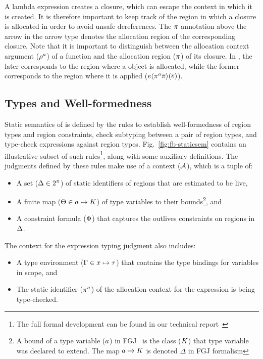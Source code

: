 A lambda expression creates a closure, which can escape the
context in which it is created. It is therefore important to keep track of
the region in which a closure is allocated in order to avoid unsafe
dereferences. The $\pi$ annotation above the arrow in the arrow
type denotes the allocation region of the corresponding closure. Note
that it is important to distinguish between the allocation context
argument ($\rho^a$) of a function and the allocation region
($\pi$) of its closure. In \name, the later corresponds to the region where
a  object is allocated, while the former corresponds to the
region where it is applied ($e\langle \pi^a\overline{\pi} \rangle(\overline{e})$). 


\subsection{Types and Well-formedness}

Static semantics of \fbname is defined by the rules to establish
well-formedness of region types and region constraints, check
subtyping between a pair of region types, and type-check expressions
against region types. Fig.~\ref{fig:fb-staticsem} contains an
illustrative subset of such rules\footnote{The full formal development
can be found in our technical report~\cite{techrep}}, along with some
auxiliary definitions. The judgments defined by these rules make use
of a context (${\mathcal{A}}$), which is a tuple of:
\begin{itemize}
\item A set ($\Delta \in 2^\pi$) of static identifiers of regions
that are estimated to be live,
\item A finite map ($\Theta \in a \mapsto K$) of type
variables to their bounds\footnote{A bound of a type variable
($a$) in FGJ~\cite{fgj} is the class ($K$) that type variable
was declared to extend.  The map $a \mapsto K$ is denoted
$\Delta$ in FGJ formalism}, and
\item A constraint formula ($\Phi$) that captures the outlives
constraints on regions in $\Delta$.
\end{itemize}
The context for the expression typing judgment also includes:
\begin{itemize}
\item A type environment ($\Gamma \in x \mapsto \tau$) that contains the
type bindings for variables in scope, and 
\item The static identifier ($\pi^a$) of the allocation context for
the expression is being type-checked.  
\end{itemize}

